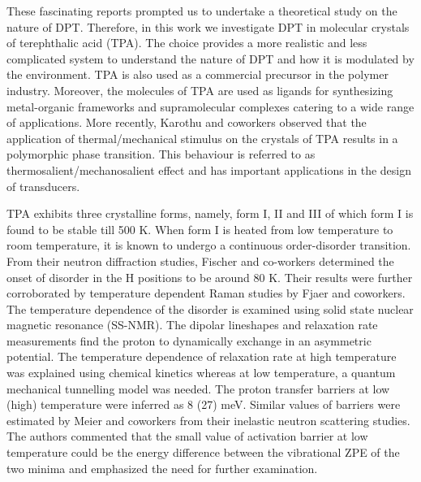 These fascinating reports prompted us to undertake a theoretical study on the nature of DPT. Therefore, in this work we investigate DPT in molecular crystals of terephthalic acid (TPA). The choice provides a more realistic and less complicated system to understand the nature of DPT and how it is modulated by the environment. TPA is also used as a commercial precursor in the polymer industry\cite{fadzil2014brief}. Moreover, the molecules of TPA are used as ligands\cite{decker2020mof,mateo2019long} for synthesizing metal-organic frameworks and supramolecular complexes catering to a wide range of applications.\cite{zhou2012introduction} More recently, Karothu and coworkers\cite{karothu2016shape} observed that the application of thermal/mechanical stimulus on the crystals of TPA results in a polymorphic phase transition\cite{karothu2016shape,ahmed2019shape}. This behaviour is referred to as thermosalient/mechanosalient effect and has important applications in the design of transducers. 

TPA exhibits three crystalline forms, namely, form I, II and III\cite{bailey1967crystal, sledz2001new} of which form I is found to be stable till 500 K\cite{sledz2001new}. When form I is heated from low temperature to room temperature, it is known to undergo a continuous order-disorder transition.\cite{fjaer1986order, fischer1986structure} From their neutron diffraction studies, Fischer and co-workers determined the onset of disorder in the H positions to be around 80 K.\cite{fischer1986structure} Their results were further corroborated by temperature dependent Raman studies by Fjaer and coworkers.\cite{fjaer1986order} The temperature dependence of the disorder is examined using solid state nuclear magnetic resonance  (SS-NMR)\cite{meier1986structure,meier1982structure}. The dipolar lineshapes and relaxation rate measurements find the proton to dynamically exchange in an asymmetric potential. The temperature dependence of relaxation rate at high temperature was explained using chemical kinetics whereas at low temperature, a quantum mechanical tunnelling model was needed. The proton transfer barriers at low (high) temperature were inferred as 8 (27) meV. Similar values of barriers were estimated by Meier and coworkers\cite{meier1983neutron} from their inelastic neutron scattering studies. The authors commented that the small value of activation barrier at low temperature could be the energy difference between the vibrational ZPE of the two minima and emphasized the need for further examination.

